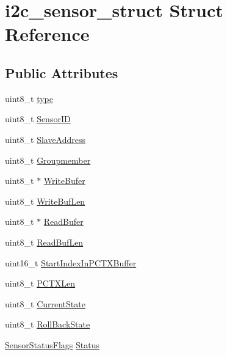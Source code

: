 \hypertarget{structi2c__sensor__struct}{\section{i2c\-\_\-sensor\-\_\-struct Struct Reference}
\label{structi2c__sensor__struct}
}
\subsection*{Public Attributes}
\begin{DoxyCompactItemize}
\item 
uint8\-\_\-t \hyperlink{structi2c__sensor__struct_a69705de26716935cb3e9e9f70a3c1014}{type}
\item 
uint8\-\_\-t \hyperlink{structi2c__sensor__struct_aa896d54931e09cfaf3e682349ff67ebc}{Sensor\-I\-D}
\item 
uint8\-\_\-t \hyperlink{structi2c__sensor__struct_a0a20808ade927f5f6b35ae30035c6497}{Slave\-Address}
\item 
uint8\-\_\-t \hyperlink{structi2c__sensor__struct_af3641e8d736b7a55bf47cecca625b457}{Groupmember}
\item 
uint8\-\_\-t $\ast$ \hyperlink{structi2c__sensor__struct_afb7749c548cfe113c165dc3aa3404201}{Write\-Bufer}
\item 
uint8\-\_\-t \hyperlink{structi2c__sensor__struct_a56a27f2bbd19d6404911424510854ab4}{Write\-Buf\-Len}
\item 
uint8\-\_\-t $\ast$ \hyperlink{structi2c__sensor__struct_a18577170561310931a1b3aead28a92ee}{Read\-Bufer}
\item 
uint8\-\_\-t \hyperlink{structi2c__sensor__struct_a96b071cb102054fff1f7a2b2a08b410c}{Read\-Buf\-Len}
\item 
uint16\-\_\-t \hyperlink{structi2c__sensor__struct_aba69a0c931d1639b77e1c3f2b7ce7345}{Start\-Index\-In\-P\-C\-T\-X\-Buffer}
\item 
uint8\-\_\-t \hyperlink{structi2c__sensor__struct_aafadf5bca4a3837e4afff6994d402cd9}{P\-C\-T\-X\-Len}
\item 
uint8\-\_\-t \hyperlink{structi2c__sensor__struct_a4e112bbb4d5a6b493aa388e874c52480}{Current\-State}
\item 
uint8\-\_\-t \hyperlink{structi2c__sensor__struct_ad1df590b17f69baaa39342db03b12203}{Roll\-Back\-State}
\item 
\hyperlink{union_sensor_status_flags}{Sensor\-Status\-Flags} \hyperlink{structi2c__sensor__struct_ae97c7a24c8a108b3b07e7757b486c802}{Status}

\end{DoxyCompactItemize}
